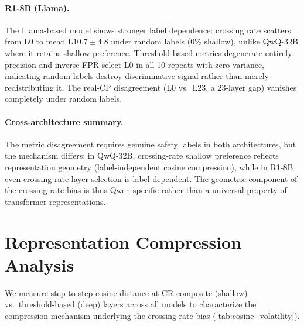 \paragraph{R1-8B (Llama).} The Llama-based model shows stronger label dependence: crossing rate scatters from L0 to mean L$10.7 \pm 4.8$ under random labels (0\% shallow), unlike QwQ-32B where it retains shallow preference. Threshold-based metrics degenerate entirely: precision and inverse FPR select L0 in all 10 repeats with zero variance, indicating random labels destroy discriminative signal rather than merely redistributing it. The real-CP disagreement (L0 vs.\ L23, a 23-layer gap) vanishes completely under random labels.

\paragraph{Cross-architecture summary.} The metric disagreement requires genuine safety labels in both architectures, but the mechanism differs: in QwQ-32B, crossing-rate shallow preference reflects representation geometry (label-independent cosine compression), while in R1-8B even crossing-rate layer selection is label-dependent. The geometric component of the crossing-rate bias is thus Qwen-specific rather than a universal property of transformer representations.

\section{Representation Compression Analysis}
\label{app:cosine_volatility}

We measure step-to-step cosine distance at CR-composite (shallow) vs.\ threshold-based (deep) layers across all models to characterize the compression mechanism underlying the crossing rate bias (\cref{tab:cosine_volatility}).

